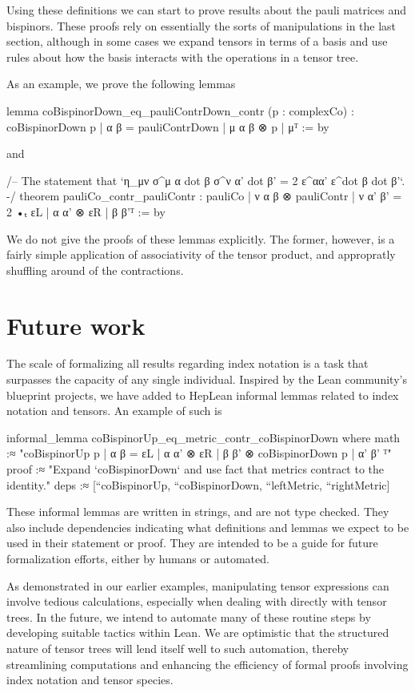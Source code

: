 \documentclass[a4paper, 11pt]{article}
\begin{document}
Using these definitions we can start to prove results about the pauli matrices and bispinors. 
These proofs rely on essentially the sorts of manipulations in the last section, although in some cases 
we expand tensors in terms of a basis and use rules about how the basis interacts with the operations in a tensor tree. 

As an example, we prove the following lemmas
\begin{code}
lemma coBispinorDown_eq_pauliContrDown_contr (p : complexCo) :
  {coBispinorDown p | α β = pauliContrDown | μ α β ⊗ p | μ}ᵀ := by
\end{code}
and 
\begin{code}
/-- The statement that `η_{μν} σ^{μ α dot β} σ^{ν α' dot β'} = 2 ε^{αα'} ε^{dot β dot β'}`. -/
theorem pauliCo_contr_pauliContr :
    {pauliCo | ν α β ⊗ pauliContr | ν α' β' = 2 •ₜ εL | α α' ⊗ εR | β β'}ᵀ := by
\end{code}
We do not give the proofs of these lemmas explicitly. 
The former, however, is a fairly simple application of  associativity of the tensor product, and appropratly shuffling 
around of the contractions. 

\section{Future work} \label{sec:future}
The scale of formalizing all results regarding index notation is a task that surpasses 
the capacity of any single individual. Inspired by the Lean community's 
blueprint projects, we have added to HepLean informal lemmas related to index notation and tensors. 
An example of such is 
\begin{code} 
informal_lemma coBispinorUp_eq_metric_contr_coBispinorDown where
  math :≈ "{coBispinorUp p | α β = εL | α α' ⊗ εR | β β' ⊗ coBispinorDown p | α' β' }ᵀ"
  proof :≈ "Expand `coBispinorDown` and use fact that metrics contract to the identity."
  deps :≈ [``coBispinorUp, ``coBispinorDown, ``leftMetric, ``rightMetric]
\end{code}
These informal lemmas are written in strings, and are not type checked.
They also include dependencies indicating what definitions and lemmas we expect to be used in their statement or proof.
They are intended to be a guide for future formalization efforts, either by humans or 
automated.

As demonstrated in our earlier examples, manipulating tensor expressions can involve tedious
 calculations, especially when dealing with directly with tensor trees. 
In the future, we intend to automate many of these routine steps by developing suitable tactics 
within Lean. We are optimistic that the structured nature of tensor trees will lend itself well to 
such automation, thereby streamlining computations and enhancing the efficiency of formal proofs
involving index notation and tensor species.
\end{document}
